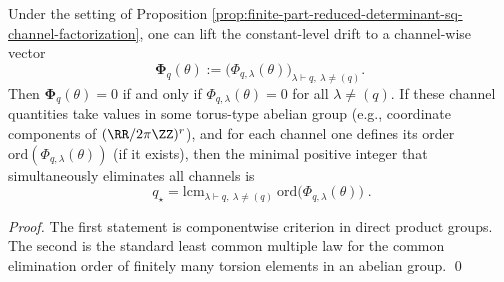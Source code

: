 \begin{corollary}\label{cor:finite-part-channel-elimination-lcm}
Under the setting of Proposition \ref{prop:finite-part-reduced-determinant-sq-channel-factorization},
one can lift the constant-level drift to a channel-wise vector
\[
\boldsymbol{\Phi}_q(\theta):=\bigl(\Phi_{q,\lambda}(\theta)\bigr)_{\lambda\vdash q,\ \lambda\neq(q)}.
\]
Then \(\boldsymbol{\Phi}_q(\theta)=0\) if and only if \(\Phi_{q,\lambda}(\theta)=0\) for all \(\lambda\neq(q)\).
If these channel quantities take values in some torus-type abelian group (e.g., coordinate components of \((\RR/2\pi\ZZ)^r\)), and for each channel one defines its order \(\mathrm{ord}(\Phi_{q,\lambda}(\theta))\) (if it exists), then the minimal positive integer that simultaneously eliminates all channels is
\[
\boxed{\;
q_\star=\mathrm{lcm}_{\lambda\vdash q,\ \lambda\neq(q)}\ \mathrm{ord}\bigl(\Phi_{q,\lambda}(\theta)\bigr)\; }.
\]
\end{corollary}
\begin{proof}
The first statement is componentwise criterion in direct product groups.
The second is the standard least common multiple law for the common elimination order of finitely many torsion elements in an abelian group. \qed
\end{proof}

